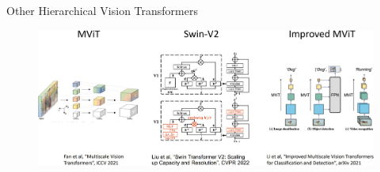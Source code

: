 \begin{frame}[allowframebreaks]{Other Hierarchical Vision Transformers}
    \begin{figure}
        \centering
        \includegraphics[width=\linewidth,height=0.9\textheight,keepaspectratio]{images/vit/slide_71_1_img.jpg}
    \end{figure}
\end{frame}
